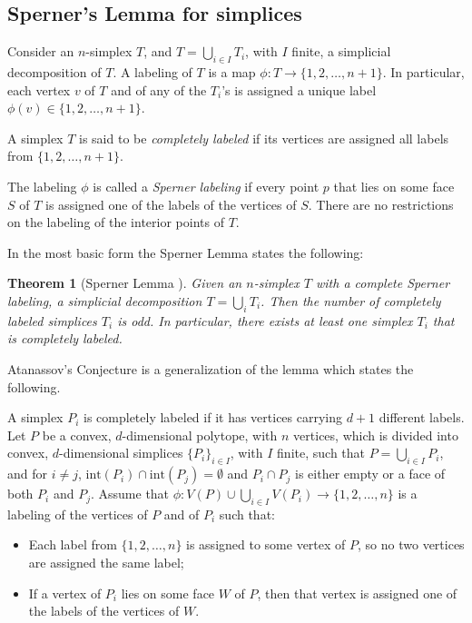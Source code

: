 \documentclass[11pt]{amsart}
\newtheorem{thm}{Theorem}[section]
\theoremstyle{definition}
\theoremstyle{remark}
\numberwithin{equation}{section}
\theoremstyle{definition}
\newcommand{\inte}{\textrm{int}}
\begin{document}
	
	\subsection{Sperner's Lemma for simplices}\label{sec:sperner}
	Consider an $n$-simplex $T$, and $T=\bigcup_{i\in I} T_i$, with $I$ finite, a simplicial decomposition of $T$.
	A labeling of $T$ is a map $\phi:T\to\{1,2,\ldots,n+1\}$. In particular, each vertex $v$ of $T$ and of any of the $T_i$'s is assigned a unique label $\phi(v)\in \{1,2,\ldots,n+1\}$.
	
	A simplex $T$ is said to be \emph{completely labeled} if its vertices are assigned all labels from $\{1,2,\ldots,n+1\}$.
	
	The labeling $\phi$ is called a \emph{Sperner labeling} if every  point $p$ that lies on some face $S$ of $T$  is assigned one of the labels of the vertices of $S$.
	There are no restrictions on the labeling of the interior points of $T$.
	
	In the most basic form the Sperner Lemma states the following:
	\begin{thm}[Sperner Lemma \cite{Sperner1928}]
		Given an $n$-simplex $T$ with a complete Sperner labeling, a simplicial decomposition $T=\bigcup_{i} T_i$.
		Then the number of completely labeled simplices $T_i$ is odd.
		In particular,  there exists at least one simplex $T_i$ that is completely labeled.
	\end{thm}
	
	Atanassov's Conjecture is a generalization of the lemma which states the following.
	
	A simplex $P_i$ is completely labeled if it has vertices carrying $d+1$ different labels. Let $P$ be a convex, $d$-dimensional polytope, with $n$ vertices, which is divided into convex, $d$-dimensional simplices $\{P_i\}_{i\in I}$, with $I$ finite, such that $P=\bigcup_{i\in I}P_i$, and  for $i\neq j$, $\inte (P_i)\cap \inte (P_j)=\emptyset$ and $P_i\cap P_j$ is either empty or a face of both $P_i$ and $P_j$. Assume that $\phi:V(P)\cup\bigcup_{i\in I}V(P_i)\to\{1,2,\ldots,n\}$ is a labeling of the vertices of $P$ and of $P_i$ such that:
	\begin{itemize}
		\item  Each label from $\{1,2,\ldots,n\}$ is assigned to some  vertex of $P$, so  no two vertices are assigned the same label;
		\item If a vertex   of $P_i$ lies on some face $W$ of $P$, then that vertex is assigned one of the labels of  the vertices of $W$.
	\end{itemize}
	
\end{document}
